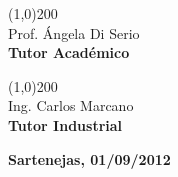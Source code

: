 \bigskip{}


\begin{center}
\line(1,0){200}\\
Prof. Ángela Di Serio\\
\textbf{Tutor Académico} 
\par\end{center}

\bigskip{}


\begin{center}
\line(1,0){200}\\
Ing. Carlos Marcano\\
\textbf{Tutor Industrial} 
\par\end{center}

\bigskip{}


\vfill{}


\begin{center}
\textbf{Sartenejas, 01/09/2012}
\par\end{center}
